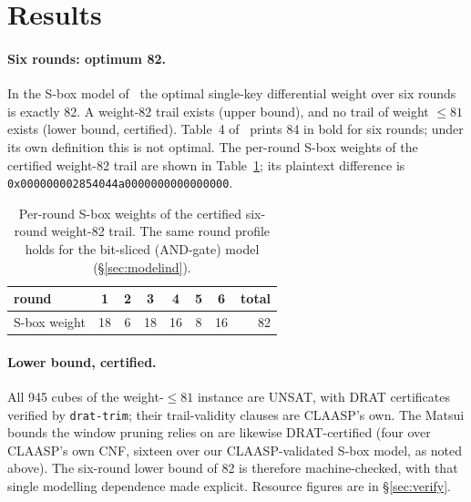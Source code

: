 \documentclass[11pt]{article}
\newcommand{\hex}[1]{\texttt{#1}}
\begin{document}
\section{Results}
\label{sec:results}

\paragraph{Six rounds: optimum 82.} In the S-box model of~\cite{claasping} the optimal single-key differential weight over six rounds is exactly 82. A weight-82 trail exists (upper bound), and no trail of weight $\le 81$ exists (lower bound, certified). Table~4 of~\cite{claasping} prints 84 in bold for six rounds; under its own definition this is not optimal. The per-round S-box weights of the certified weight-82 trail are shown in Table~\ref{tab:perround}; its plaintext difference is \hex{0x000000002854044a0000000000000000}.

\begin{table}[t]
\centering
\begin{tabular}{lcccccc r}
\toprule
round & 1 & 2 & 3 & 4 & 5 & 6 & total\\
\midrule
S-box weight & 18 & 6 & 18 & 16 & 8 & 16 & 82\\
\bottomrule
\end{tabular}
\caption{Per-round S-box weights of the certified six-round weight-82 trail. The same round profile holds for the bit-sliced (AND-gate) model (\S\ref{sec:modelind}).}
\label{tab:perround}
\end{table}

\paragraph{Lower bound, certified.} All 945 cubes of the weight-$\le 81$ instance are UNSAT, with DRAT certificates verified by \texttt{drat-trim}; their trail-validity clauses are CLAASP's own. The Matsui bounds the window pruning relies on are likewise DRAT-certified (four over CLAASP's own CNF, sixteen over our CLAASP-validated S-box model, as noted above). The six-round lower bound of 82 is therefore machine-checked, with that single modelling dependence made explicit. Resource figures are in \S\ref{sec:verify}.
\end{document}
